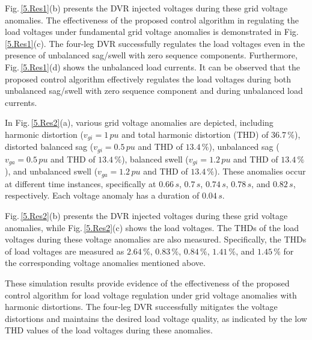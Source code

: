 Fig.\,\ref{5.Res1}(b) presents the DVR injected voltages during these grid voltage anomalies. The effectiveness of the proposed control algorithm in regulating the load voltages under fundamental grid voltage anomalies is demonstrated in Fig.\,\ref{5.Res1}(c). The four-leg DVR successfully regulates the load voltages even in the presence of unbalanced sag/swell with zero sequence components. Furthermore, Fig.\,\ref{5.Res1}(d) shows the unbalanced load currents. It can be observed that the proposed control algorithm effectively regulates the load voltages during both unbalanced sag/swell with zero sequence component and during unbalanced load currents.

In Fig.\,\ref{5.Res2}(a), various grid voltage anomalies are depicted, including harmonic distortion ($v_{gi} = 1\,\si{pu}$ and total harmonic distortion (THD) of $36.7\,\%$), distorted balanced sag ($v_{gi} = 0.5\,\si{pu}$ and THD of $13.4\,\%$), unbalanced sag ($v_{ga} = 0.5\,\si{pu}$ and THD of $13.4\,\%$), balanced swell ($v_{gi} = 1.2\,\si{pu}$ and THD of $13.4\,\%$), and unbalanced swell ($v_{ga} = 1.2\,\si{pu}$ and THD of $13.4\,\%$). These anomalies occur at different time instances, specifically at $0.66 \, \si{s}$, $0.7 \, \si{s}$, $0.74 \, \si{s}$, $0.78 \, \si{s}$, and $0.82 \, \si{s}$, respectively. Each voltage anomaly has a duration of $0.04 \, \si{s}$.

Fig.\,\ref{5.Res2}(b) presents the DVR injected voltages during these grid voltage anomalies, while Fig.\,\ref{5.Res2}(c) shows the load voltages. The THDs of the load voltages during these voltage anomalies are also measured. Specifically, the THDs of load voltages are measured as $2.64\,\%$, $0.83\,\%$, $0.84\,\%$, $1.41\,\%$, and $1.45\,\%$ for the corresponding voltage anomalies mentioned above. 

These simulation results provide evidence of the effectiveness of the proposed control algorithm for load voltage regulation under grid voltage anomalies with harmonic distortions. The four-leg DVR successfully mitigates the voltage distortions and maintains the desired load voltage quality, as indicated by the low THD values of the load voltages during these anomalies. 

